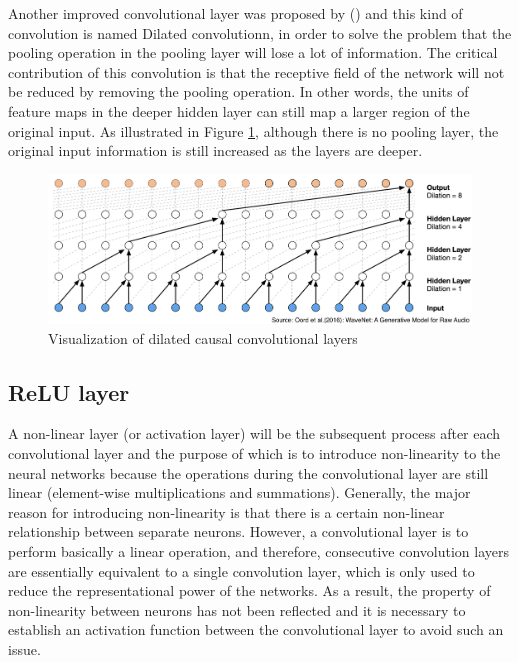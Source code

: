\documentclass[]{krantz}
\begin{document}
Another improved convolutional layer was proposed by (\citet{Kalchbrenner2016NeuralMT}) and this kind of convolution is named Dilated convolutionn, in order to solve the problem that the pooling operation in the pooling layer will lose a lot of information. The critical contribution of this convolution is that the receptive field of the network will not be reduced by removing the pooling operation. In other words, the units of feature maps in the deeper hidden layer can still map a larger region of the original input. As illustrated in Figure \ref{fig:figs-dilated}, although there is no pooling layer, the original input information is still increased as the layers are deeper.

\begin{figure}[ht]

{\centering \includegraphics[width=0.65\linewidth]{figures/01-03-cnns-and-their-applications-in-nlp/Temporal} 

}

\caption{Visualization of dilated causal convolutional layers}\label{fig:figs-dilated}
\end{figure}

\hypertarget{relu-layer}{%
\subsection{ReLU layer}\label{relu-layer}}

A non-linear layer (or activation layer) will be the subsequent process after each convolutional layer and the purpose of which is to introduce non-linearity to the neural networks because the operations during the convolutional layer are still linear (element-wise multiplications and summations). Generally, the major reason for introducing non-linearity is that there is a certain non-linear relationship between separate neurons. However, a convolutional layer is to perform basically a linear operation, and therefore, consecutive convolution layers are essentially equivalent to a single convolution layer, which is only used to reduce the representational power of the networks. As a result, the property of non-linearity between neurons has not been reflected and it is necessary to establish an activation function between the convolutional layer to avoid such an issue.
\end{document}
